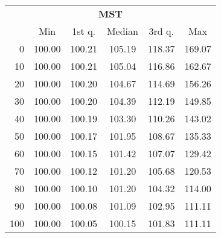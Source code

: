 \begin{tabular}{r|ccccc}
  \multicolumn{6}{c}{{\bf MST}} \\
  & Min & 1st q. & Median & 3rd q. & Max \\ \hline\hline
  0 & 100.00 & 100.21 & 105.19 & 118.37 & 169.07
\\ 10 & 100.00 & 100.21 & 105.04 & 116.86 & 162.67
\\ 20 & 100.00 & 100.20 & 104.67 & 114.69 & 156.26
\\ 30 & 100.00 & 100.20 & 104.39 & 112.19 & 149.85
\\ 40 & 100.00 & 100.19 & 103.30 & 110.26 & 143.02
\\ 50 & 100.00 & 100.17 & 101.95 & 108.67 & 135.33
\\ 60 & 100.00 & 100.15 & 101.42 & 107.07 & 129.42
\\ 70 & 100.00 & 100.12 & 101.20 & 105.68 & 120.53
\\ 80 & 100.00 & 100.10 & 101.20 & 104.32 & 114.00
\\ 90 & 100.00 & 100.08 & 101.09 & 102.95 & 111.11
\\ 100 & 100.00 & 100.05 & 100.15 & 101.83 & 111.11
\end{tabular}
